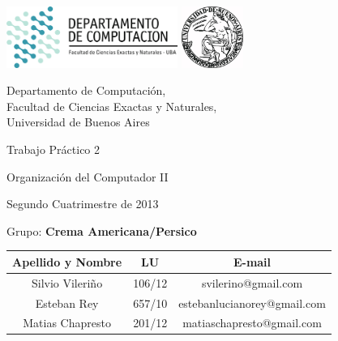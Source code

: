 \documentclass[a4paper,10pt,twoside]{article}
\begin{document}


\thispagestyle{caratula}

\begin{center}

\includegraphics[height=2cm]{DC.png} 
\hfill
\includegraphics[height=2cm]{UBA.jpg} 

\vspace{2cm}

Departamento de Computación,\\
Facultad de Ciencias Exactas y Naturales,\\
Universidad de Buenos Aires

\vspace{4cm}

\begin{Huge}
Trabajo Práctico 2
\end{Huge}

\vspace{0.5cm}

\begin{Large}
Organización del Computador II
\end{Large}

\vspace{1cm}

Segundo Cuatrimestre de 2013

\vspace{4cm}

Grupo: \textbf{Crema Americana/Persico}

\vspace{0.5cm}

\begin{tabular}{|c|c|c|}
    \hline
    Apellido y Nombre & LU & E-mail\\
    \hline
    Silvio Vileriño             & 106/12 & svilerino@gmail.com\\
    Esteban Rey 				& 657/10 & estebanlucianorey@gmail.com\\
    Matias Chapresto 			& 201/12 & matiaschapresto@gmail.com\\
    \hline
\end{tabular}


\end{center}
\end{document}

